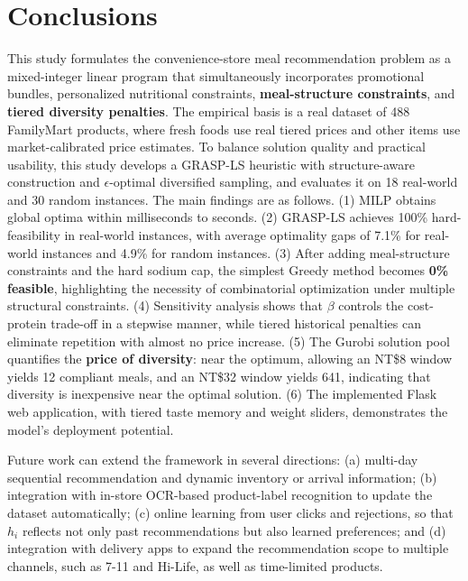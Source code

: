 \documentclass[a4paper]{article}
\begin{document}
\section{Conclusions}
This study formulates the convenience-store meal recommendation problem as a mixed-integer linear program that simultaneously incorporates promotional bundles, personalized nutritional constraints, \textbf{meal-structure constraints}, and \textbf{tiered diversity penalties}. The empirical basis is a real dataset of 488 FamilyMart products, where fresh foods use real tiered prices and other items use market-calibrated price estimates. To balance solution quality and practical usability, this study develops a GRASP-LS heuristic with structure-aware construction and $\epsilon$-optimal diversified sampling, and evaluates it on 18 real-world and 30 random instances. The main findings are as follows. (1) MILP obtains global optima within milliseconds to seconds. (2) GRASP-LS achieves 100\% hard-feasibility in real-world instances, with average optimality gaps of 7.1\% for real-world instances and 4.9\% for random instances. (3) After adding meal-structure constraints and the hard sodium cap, the simplest Greedy method becomes \textbf{0\% feasible}, highlighting the necessity of combinatorial optimization under multiple structural constraints. (4) Sensitivity analysis shows that $\beta$ controls the cost-protein trade-off in a stepwise manner, while tiered historical penalties can eliminate repetition with almost no price increase. (5) The Gurobi solution pool quantifies the \textbf{price of diversity}: near the optimum, allowing an NT\$8 window yields 12 compliant meals, and an NT\$32 window yields 641, indicating that diversity is inexpensive near the optimal solution. (6) The implemented Flask web application, with tiered taste memory and weight sliders, demonstrates the model's deployment potential.

Future work can extend the framework in several directions: (a) multi-day sequential recommendation and dynamic inventory or arrival information; (b) integration with in-store OCR-based product-label recognition to update the dataset automatically; (c) online learning from user clicks and rejections, so that $h_i$ reflects not only past recommendations but also learned preferences; and (d) integration with delivery apps to expand the recommendation scope to multiple channels, such as 7-11 and Hi-Life, as well as time-limited products.
\end{document}
